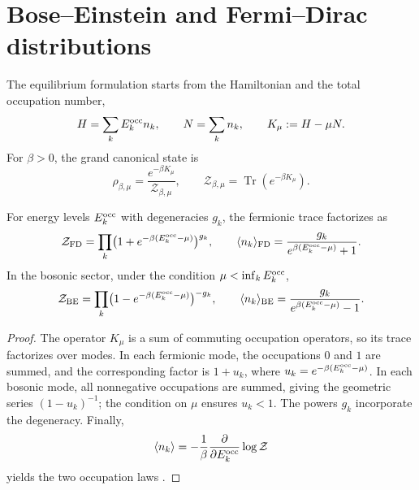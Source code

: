 \section{Bose--Einstein and Fermi--Dirac distributions}
\label{v:rec:ocupacion:section:02}

The equilibrium formulation starts from the Hamiltonian and the total
occupation number,
\begin{equation}
 H=\sum_kE_k^{\rm occ} n_k,
 \qquad
 N=\sum_k n_k,
 \qquad
 K_\mu:=H-\mu N.
 \label{v:rec:eq:hamiltoniano-gran-canonico-rev3}
\end{equation}
For \(\beta>0\), the grand canonical state is
\begin{equation}
 \rho_{\beta,\mu}
 =\frac{e^{-\beta K_\mu}}{\mathcal Z_{\beta,\mu}},
 \qquad
 \mathcal Z_{\beta,\mu}
 =\operatorname{Tr}(e^{-\beta K_\mu}).
 \label{v:rec:eq:estado-gran-canonico-rev3}
\end{equation}

\begin{theorem}
\label{v:rec:thm:factorizacion-gran-canonica-rev3}
For energy levels \(E_k^{\rm occ}\) with degeneracies \(g_k\), the
fermionic trace factorizes as
\begin{equation}
 \mathcal Z_{\rm FD}
 =\prod_k\bigl(1+e^{-\beta(E_k^{\rm occ}-\mu)}\bigr)^{g_k},
 \qquad
 \langle n_k\rangle_{\rm FD}
 =\frac{g_k}{e^{\beta(E_k^{\rm occ}-\mu)}+1}.
 \label{v:rec:eq:factorizacion-fd-rev3}
\end{equation}
In the bosonic sector, under the condition
\(\mu<\inf_kE_k^{\rm occ}\),
\begin{equation}
 \mathcal Z_{\rm BE}
 =\prod_k\bigl(1-e^{-\beta(E_k^{\rm occ}-\mu)}\bigr)^{-g_k},
 \qquad
 \langle n_k\rangle_{\rm BE}
 =\frac{g_k}{e^{\beta(E_k^{\rm occ}-\mu)}-1}.
 \label{v:rec:eq:factorizacion-be-rev3}
\end{equation}
\end{theorem}

\begin{proof}
The operator \(K_\mu\) is a sum of commuting occupation operators, so
its trace factorizes over modes. In each fermionic mode, the
occupations \(0\) and \(1\) are summed, and the corresponding factor is
\(1+u_k\), where
\(u_k=e^{-\beta(E_k^{\rm occ}-\mu)}\). In each bosonic mode, all
nonnegative occupations are summed, giving the geometric series
\((1-u_k)^{-1}\); the condition on \(\mu\) ensures \(u_k<1\). The
powers \(g_k\) incorporate the degeneracy. Finally,
\[
 \langle n_k\rangle
 =-\frac1\beta\frac{\partial}{\partial E_k^{\rm occ}}
   \log\mathcal Z
\]
yields the two occupation laws
\cite{Bose1924,Einstein1924,Fermi1926,Dirac1926,Pathria2011}.
\end{proof}
